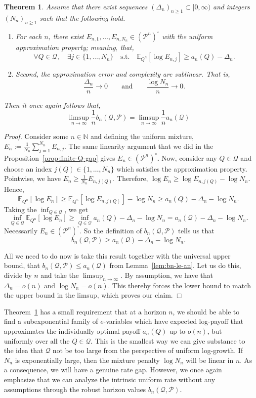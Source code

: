 \documentclass[11pt]{article}
\newcommand{\E}{\mathbb{E}}
\newcommand{\Pcal}{\mathcal{P}}
\newcommand{\Qcal}{\mathcal{Q}}
\newtheorem{theorem}{Theorem}[section]
\theoremstyle{definition}
\theoremstyle{definition}
\begin{document}
\begin{theorem}\label{thm:subexp-cover}
Assume that there exist sequences $(\Delta_n)_{n\ge 1}\subset[0,\infty)$ and integers $(N_n)_{n\ge 1}$ such that the following hold.
\begin{enumerate}
    \item For each $n$, there exist $E_{n,1},\dots,E_{n,N_n}\in(\Pcal^n)^\circ$ with the uniform approximation property; meaning, that,
    \[
    \forall Q\in\Qcal,\quad\exists j\in\{1,\dots,N_n\}\quad\text{s.t.}\quad \E_{Q^n}[\log E_{n,j}] \ge a_n(Q)-\Delta_n.
    \]
    \item Second, the approximation error and complexity are sublinear. That is,
    \[
    \frac{\Delta_n}{n}\longrightarrow 0 \qquad\text{and}\qquad \frac{\log N_n}{n}\longrightarrow 0.
    \]
\end{enumerate}
Then it once again follows that,
\[
\limsup_{n\to\infty}\frac{1}{n}b_n(\Qcal,\Pcal) = \limsup_{n\to\infty}\frac{1}{n}a_n(\Qcal)
\]
\end{theorem}

\begin{proof}
Consider some $n\in\mathbb N$ and defining the uniform mixture, $E_n:=\frac{1}{N_n}\sum_{j=1}^{N_n} E_{n,j}$. The same linearity argument that we did in the Proposition~\ref{prop:finite-Q-gap} gives $E_n\in(\Pcal^n)^\circ$. Now, consider any $Q\in\Qcal$ and choose an index $j(Q)\in\{1,\dots,N_n\}$ which satisfies the approximation property. Pointwise, we have $E_n\ge \frac{1}{N_n}E_{n,j(Q)}$. Therefore, $\log E_n\ge \log E_{n,j(Q)}-\log N_n$. Hence,
\[
\E_{Q^n}[\log E_n]\ge \E_{Q^n}[\log E_{n,j(Q)}]-\log N_n\ge a_n(Q)-\Delta_n-\log N_n.
\]
Taking the $\inf_{Q\in\Qcal}$, we get
\[
\inf_{Q\in\Qcal}\E_{Q^n}[\log E_n] \ge \inf_{Q\in\Qcal}a_n(Q)-\Delta_n-\log N_n= a_n(\Qcal)-\Delta_n-\log N_n.
\]
Necessarily $E_n\in(\Pcal^n)^\circ$. So the definition of $b_n(\Qcal,\Pcal)$ tells us that
\[
b_n(\Qcal,\Pcal) \ge a_n(\Qcal)-\Delta_n-\log N_n.
\]

All we need to do now is take this result together with the universal upper bound, that $b_n(\Qcal,\Pcal)\le a_n(\Qcal)$ from Lemma~\ref{lem:bn-le-an}. Let us do this, divide by $n$ and take the $\limsup_{n\to\infty}$. By assumption, we have that $\Delta_n=o(n)$ and $\log N_n=o(n)$. This thereby forces the lower bound to match the upper bound in the limsup, which proves our claim.
\end{proof}

Theorem~\ref{thm:subexp-cover} has a small requirement that at a horizon $n$, we should be able to find a subexponential family of $e$-variables which have expected log-payoff that approximates the individually optimal payoff $a_n(Q)$ up to $o(n)$, but uniformly over all the $Q\in\Qcal$. This is the smallest way we can give substance to the idea that $\Qcal$ not be too large from the perspective of uniform log-growth. If $N_n$ is exponentially large, then the mixture penalty $\log N_n$ will be linear in $n$. As a consequence, we will have a genuine rate gap. However, we once again emphasize that we can analyze the intrinsic uniform rate without any assumptions through the robust horizon values $b_n(\Qcal,\Pcal)$.
\end{document}
